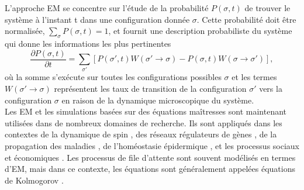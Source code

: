 L'approche EM se concentre sur l'étude de la probabilité $P(\sigma,t)$ de trouver le système à l'instant t dans une configuration donnée $\sigma$. Cette probabilité doit être normalisée, $\sum_{\sigma}P(\sigma,t)=1$, et fournit une description probabiliste du système qui donne les informations les plus pertinentes
\begin{equation}
\frac{\partial P(\sigma,t)}{\partial t}=\sum_{\sigma'}[P(\sigma',t)W(\sigma'\rightarrow \sigma)-P(\sigma,t)W(\sigma\rightarrow \sigma')],
\end{equation}
où la somme s'exécute sur toutes les configurations possibles $\sigma$ et les termes $W(\sigma'\rightarrow \sigma)$ représentent les taux de transition de la configuration $\sigma'$ vers la configuration $\sigma$ en raison de la dynamique microscopique du système.\\ 
Les EM et les simulations basées sur des équations maîtresses sont maintenant utilisées dans de nombreux domaines de recherche. Ils sont appliqués dans les contextes de la dynamique de spin \cite{Glauber1963,Kawasaki1966-1,Kawasaki1966-2,Kawasaki1966-3}, des réseaux régulateurs de gènes \cite{Walczak-al2009,Rao-al2002,Tsimring2014}, de la propagation des maladies \cite{Bailey1950,Rock2014}, de l'homéostasie épidermique \cite{Clayton-al2007}, et les processus sociaux et économiques \cite{Weidlich-Braun1992}. Les processus de file d'attente sont souvent modélisés en termes d'EM, mais dans ce contexte, les équations sont généralement appelées équations de Kolmogorov \cite{Gross-al2008}. 

